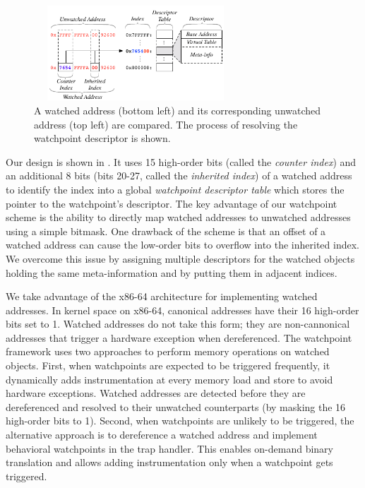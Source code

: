 \documentclass[letterpaper,twocolumn,10pt]{article}
\begin{document}
\begin{figure}[t]
\begin{center}
\includegraphics[width=3.0in, height=1.4in]{watchpoints.pdf}
\end{center}
\vspace{-15pt}
\caption{\label{fig:watchpoint_descriptor_table}A watched address (bottom left) and its corresponding unwatched address (top left) are compared. The process of resolving the watchpoint descriptor is shown.}
\end{figure}

Our design is shown in . It uses 15 high-order bits (called the \emph{counter index}) and an additional 8 bits (bits 20-27, called the \emph{inherited index}) of a watched address to identify the index into a global \emph{watchpoint descriptor table} which stores the pointer to the watchpoint's descriptor. %
The key advantage of our watchpoint scheme is the ability to directly map watched addresses to unwatched addresses using a simple bitmask. One drawback of the scheme is that an offset of a watched address can cause the low-order bits to overflow into the inherited index. We overcome this issue by assigning multiple descriptors for the watched objects holding the same meta-information and by putting them in adjacent indices. 


We take advantage of the x86-64 architecture for implementing watched addresses. In kernel space on x86-64, canonical addresses have their 16 high-order bits set to 1. Watched addresses do not take this form; they are non-cannonical addresses that trigger a hardware exception when dereferenced. 
The watchpoint framework uses two approaches to perform memory operations on watched objects. First, when watchpoints are expected to be triggered frequently, it dynamically adds instrumentation at every memory load and store to avoid hardware exceptions. Watched addresses are detected before they are dereferenced and resolved to their unwatched counterparts (by masking the 16 high-order bits to 1). Second, when watchpoints are unlikely to be triggered, the alternative approach is to dereference a watched address and implement behavioral watchpoints in the trap handler. This enables on-demand binary translation and allows adding instrumentation only when a watchpoint gets triggered.%
\end{document}

